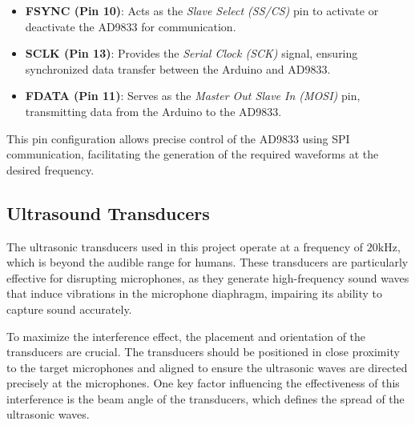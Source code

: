 \begin{itemize}
    \item \textbf{FSYNC (Pin 10)}: Acts as the \textit{Slave Select (SS/CS)} pin to activate or deactivate the AD9833 for communication.
    \item \textbf{SCLK (Pin 13)}: Provides the \textit{Serial Clock (SCK)} signal, ensuring synchronized data transfer between the Arduino and AD9833.
    \item \textbf{FDATA (Pin 11)}: Serves as the \textit{Master Out Slave In (MOSI)} pin, transmitting data from the Arduino to the AD9833.
\end{itemize}

This pin configuration allows precise control of the AD9833 using SPI communication, facilitating the generation of the required waveforms at the desired frequency.

\subsection{Ultrasound Transducers}

The ultrasonic transducers used in this project operate at a frequency of $20 \text{kHz}$, which is beyond the audible range for humans. These transducers are particularly effective for disrupting microphones, as they generate high-frequency sound waves that induce vibrations in the microphone diaphragm, impairing its ability to capture sound accurately.

To maximize the interference effect, the placement and orientation of the transducers are crucial. The transducers should be positioned in close proximity to the target microphones and aligned to ensure the ultrasonic waves are directed precisely at the microphones. One key factor influencing the effectiveness of this interference is the beam angle of the transducers, which defines the spread of the ultrasonic waves.


